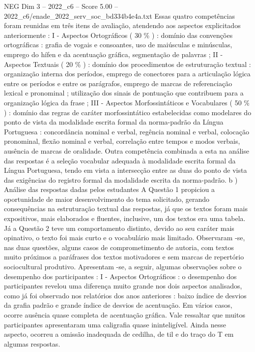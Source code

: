 \begin{textsample}{NEG Dim 3 – 2022\_c6 – Score 5.00 – 2022\_c6/enade\_2022\_serv\_soc\_bd334b4e4a.txt}
Essas quatro competências foram reunidas em três itens de avaliação, atendendo aos aspectos explicitados anteriormente : I - Aspectos Ortográficos ( 30 \% ) : domínio das convenções ortográficas : grafia de vogais e consoantes, uso de maiúsculas e minúsculas, emprego do hífen e da acentuação gráfica, segmentação de palavras ; II - Aspectos Textuais ( 20 \% ) : domínio dos procedimentos de estruturação textual : organização interna dos períodos, emprego de conectores para a articulação lógica entre os períodos e entre os parágrafos, emprego de marcas de referenciação lexical e pronominal ; utilização dos sinais de pontuação que contribuem para a organização lógica da frase ; III - Aspectos Morfossintáticos e Vocabulares ( 50 \% ) : domínio das regras de caráter morfossintático estabelecidas como modelares do ponto de vista da modalidade escrita formal da norma-padrão da Língua Portuguesa : concordância nominal e verbal, regência nominal e verbal, colocação pronominal, flexão nominal e verbal, correlação entre tempos e modos verbais, ausência de marcas de oralidade.
Outra competência combinada a esta na análise das respostas é a seleção vocabular adequada à modalidade escrita formal da Língua Portuguesa, tendo em vista a intersecção entre as duas do ponto de vista das exigências do registro formal da modalidade escrita da norma-padrão. b ) Análise das respostas dadas pelos estudantes A Questão 1 propiciou a oportunidade de maior desenvolvimento do tema solicitado, gerando consequências na estruturação textual das respostas, já que os textos foram mais expositivos, mais elaborados e fluentes, inclusive, um dos textos era uma tabela.
Já a Questão 2 teve um comportamento distinto, devido ao seu caráter mais opinativo, o texto foi mais curto e o vocabulário mais limitado.
Observaram -se, nas duas questões, alguns casos de comprometimento de autoria, com textos muito próximos a paráfrases dos textos motivadores e sem marcas de repertório sociocultural produtivo.
Apresentam -se, a seguir, algumas observações sobre o desempenho dos participantes : I - Aspectos Ortográficos : o desempenho dos participantes revelou uma diferença muito grande nos dois aspectos analisados, como já foi observado nos relatórios dos anos anteriores : baixo índice de desvios da grafia padrão e grande índice de desvios de acentuação.
Em vários casos, ocorre ausência quase completa de acentuação gráfica.
Vale ressaltar que muitos participantes apresentaram uma caligrafia quase ininteligível.
Ainda nesse aspecto, ocorreu a omissão inadequada de cedilha, de til e do traço do T em algumas respostas.

\end{textsample}
